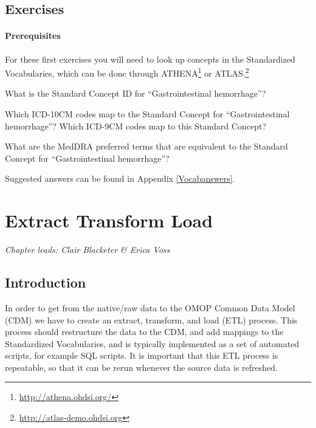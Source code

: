 \documentclass[11pt]{book}
\let\rmarkdownfootnote\footnote%
\def\footnote{\protect\rmarkdownfootnote}
\theoremstyle{definition}
\theoremstyle{definition}
\theoremstyle{definition}
\theoremstyle{remark}
\let\BeginKnitrBlock\begin \let\EndKnitrBlock\end
\begin{document}
\section{Exercises}\label{exercises}

\subsubsection*{Prerequisites}\label{prerequisites}

For these first exercises you will need to look up concepts in the
Standardized Vocabularies, which can be done through ATHENA\footnote{\url{http://athena.ohdsi.org/}}
or ATLAS.\footnote{\url{http://atlas-demo.ohdsi.org}}

\BeginKnitrBlock{exercise}
\protect\hypertarget{exr:exerciseVocab1}{}{\label{exr:exerciseVocab1} }What
is the Standard Concept ID for ``Gastrointestinal hemorrhage''?
\EndKnitrBlock{exercise}

\BeginKnitrBlock{exercise}
\protect\hypertarget{exr:exerciseVocab2}{}{\label{exr:exerciseVocab2} }Which
ICD-10CM codes map to the Standard Concept for ``Gastrointestinal
hemorrhage''? Which ICD-9CM codes map to this Standard Concept?
\EndKnitrBlock{exercise}

\BeginKnitrBlock{exercise}
\protect\hypertarget{exr:exerciseVocab3}{}{\label{exr:exerciseVocab3} }What
are the MedDRA preferred terms that are equivalent to the Standard
Concept for ``Gastrointestinal hemorrhage''?
\EndKnitrBlock{exercise}

Suggested answers can be found in Appendix \ref{Vocabanswers}.

\chapter{Extract Transform Load}\label{ExtractTransformLoad}

\emph{Chapter leads: Clair Blacketer \& Erica Voss}

\section{Introduction}\label{introduction-1}

In order to get from the native/raw data to the OMOP Common Data Model
(CDM) we have to create an extract, transform, and load (ETL) process.
This process should restructure the data to the CDM, and add mappings to
the Standardized Vocabularies, and is typically implemented as a set of
automated scripts, for example SQL scripts. It is important that this
ETL process is repeatable, so that it can be rerun whenever the source
data is refreshed. 
 
\end{document}
